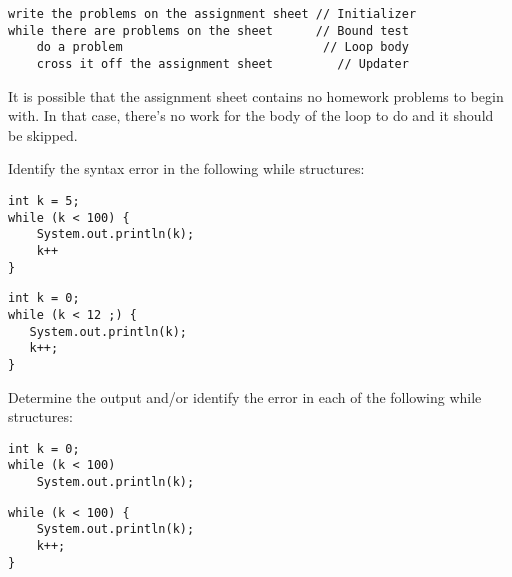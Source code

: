 \begin{jjjlisting}
\begin{lstlisting}
write the problems on the assignment sheet // Initializer
while there are problems on the sheet      // Bound test
    do a problem                            // Loop body
    cross it off the assignment sheet         // Updater
\end{lstlisting}
\end{jjjlisting}

\noindent It is possible that the assignment sheet contains
no homework problems to begin with. In that case, there's no work for
the body of the loop to do and it should be skipped.

\begin{SSTUDY}
\item  Identify the syntax error in the following while structures:
\begin{EXRLL}
\item

\begin{jjjlisting}
\begin{lstlisting}
int k = 5;
while (k < 100) {
    System.out.println(k);
    k++
}
\end{lstlisting}
\end{jjjlisting}

\item 

\begin{jjjlisting}
\begin{lstlisting}
int k = 0;
while (k < 12 ;) {
   System.out.println(k);
   k++;
}
\end{lstlisting}
\end{jjjlisting}
\end{EXRLL}


\item  Determine the output and/or identify the error in each of the following
while structures:
\begin{EXRLL}
\item

\begin{jjjlisting}
\begin{lstlisting}
int k = 0;
while (k < 100)
    System.out.println(k);
\end{lstlisting}
\end{jjjlisting}

\item

\begin{jjjlisting}
\begin{lstlisting}
while (k < 100) {
    System.out.println(k);
    k++;
}
\end{lstlisting}
\end{jjjlisting}
\end{EXRLL}



\end{SSTUDY}
